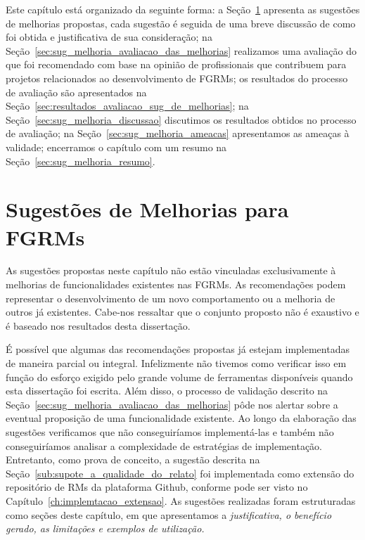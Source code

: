 Este capítulo está organizado da seguinte forma: a
Seção~\ref{sec:sug_melhoria_melhorando_as_ferraementas} apresenta as sugestões
de melhorias propostas, cada sugestão é seguida de uma breve discussão de como
foi obtida e justificativa de sua consideração; na
Seção~\ref{sec:sug_melhoria_avaliacao_das_melhorias} realizamos uma avaliação do
que foi recomendado com base na opinião de profissionais que contribuem para
projetos relacionados ao desenvolvimento de FGRMs; os resultados do processo de
avaliação são apresentados na
Seção~\ref{sec:resultados_avaliacao_sug_de_melhorias}; na
Seção~\ref{sec:sug_melhoria_discussao} discutimos os resultados obtidos no
processo de avaliação; na Seção~\ref{sec:sug_melhoria_ameacas} apresentamos as
ameaças à validade; encerramos o capítulo com um resumo na
Seção~\ref{sec:sug_melhoria_resumo}.

\section{Sugestões de Melhorias para FGRMs}\label{sec:sug_melhoria_melhorando_as_ferraementas}

As sugestões propostas neste capítulo não estão vinculadas exclusivamente à
melhorias de funcionalidades existentes nas FGRMs. As recomendações podem
representar o desenvolvimento de um novo comportamento ou a melhoria de outros
já existentes. Cabe-nos ressaltar que o conjunto proposto não é exaustivo e é
baseado nos resultados desta dissertação.

É possível que algumas das recomendações propostas já estejam implementadas de
maneira parcial ou integral.  Infelizmente não tivemos como verificar isso em
função do esforço exigido pelo grande volume de ferramentas disponíveis quando
esta dissertação foi escrita. Além disso, o processo de validação descrito na
Seção~\ref{sec:sug_melhoria_avaliacao_das_melhorias} pôde nos alertar sobre a
eventual proposição de uma funcionalidade existente. Ao longo da elaboração das
sugestões verificamos que não conseguiríamos implementá-las e também não
conseguiríamos analisar a complexidade de estratégias de implementação.
Entretanto, como prova de conceito, a sugestão descrita na
Seção~\ref{sub:supote_a_qualidade_do_relato} foi implementada como extensão do
repositório de RMs da plataforma Github, conforme pode ser visto no
Capítulo~\ref{ch:implemtacao_extensao}. As sugestões realizadas foram
estruturadas como seções deste capítulo, em que apresentamos a
\textit{justificativa, o benefício gerado, as limitações e exemplos de
    utilização.}

